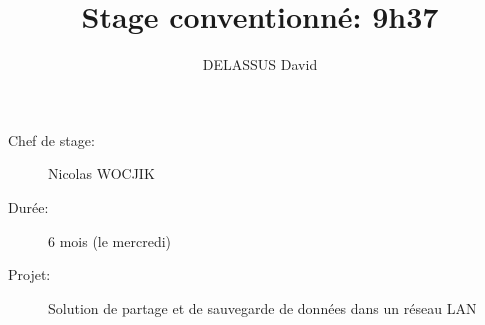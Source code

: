 \documentclass[a4paper]{article}
\begin{document}
     \title{Stage conventionné: 9h37}
     \author{DELASSUS David}
     \maketitle

     \begin{description}
          \item[Chef de stage:] Nicolas WOCJIK
          \item[Durée:] 6 mois (le mercredi)
          \item[Projet:] Solution de partage et de sauvegarde de données dans un réseau LAN
     \end{description}

     \pagebreak
     \tableofcontents

     
     
\end{document}

